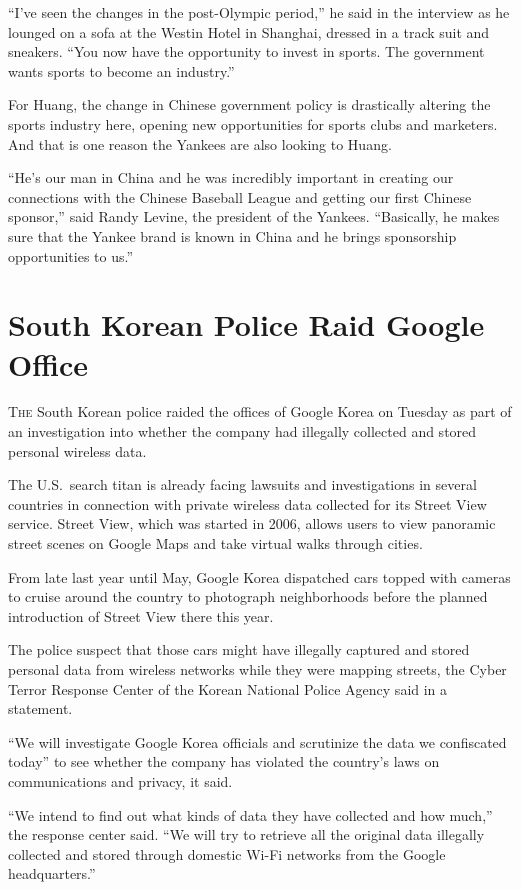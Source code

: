 ﻿\documentclass[12pt]{article}
\begin{document}
``I've seen the changes in the post-Olympic period,'' he said in the interview as he lounged on a
sofa at the Westin Hotel in Shanghai, dressed in a track suit and sneakers. ``You now have the
opportunity to invest in sports. The government wants sports to become an industry.''

For Huang, the change in Chinese government policy is drastically altering the sports industry here,
opening new opportunities for sports clubs and marketers. And that is one reason the Yankees are
also looking to Huang.

``He's our man in China and he was incredibly important in creating our connections with the Chinese
Baseball League and getting our first Chinese sponsor,'' said Randy Levine, the president of the
Yankees. ``Basically, he makes sure that the Yankee brand is known in China and he brings
sponsorship opportunities to us.''

\section{South Korean Police Raid Google Office}

\lettrine{T}{he} South Korean police raided the offices of Google Korea on
Tuesday as part of an investigation into whether the company had illegally collected and stored
personal wireless data.

The U.S.~search titan is already facing lawsuits and investigations in several countries in
connection with private wireless data collected for its Street View service. Street View, which was
started in 2006, allows users to view panoramic street scenes on Google Maps and take virtual walks
through cities.

From late last year until May, Google Korea dispatched cars topped with cameras to cruise around the
country to photograph neighborhoods before the planned introduction of Street View there this year.

The police suspect that those cars might have illegally captured and stored personal data from
wireless networks while they were mapping streets, the Cyber Terror Response Center of the Korean
National Police Agency said in a statement.

``We will investigate Google Korea officials and scrutinize the data we confiscated today'' to see
whether the company has violated the country's laws on communications and privacy, it said.

``We intend to find out what kinds of data they have collected and how much,'' the response center
said. ``We will try to retrieve all the original data illegally collected and stored through
domestic Wi-Fi networks from the Google headquarters.''
\end{document}
